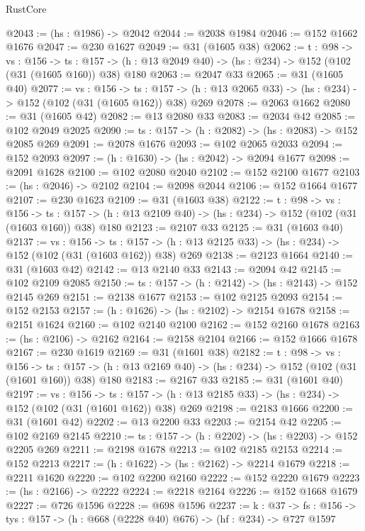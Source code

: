 \begin{lexlean}{RustCore}
\begin{coremodule}
@2043 := (hs : @1986) -> @2042
@2044 := @2038 @1984
@2046 := @152 @1662 @1676
@2047 := @230 @1627
@2049 := @31 (@1605 @38)
@2062 := {t : @98} ->
  {vs : @156} ->
  {ts : @157} -> (h : @13 @2049 @40) -> (hs : @234) -> @152 (@102 (@31 (@1605 @160)) @38) @180
@2063 := @2047 @33
@2065 := @31 (@1605 @40)
@2077 := {vs : @156} ->
  {ts : @157} -> (h : @13 @2065 @33) -> (hs : @234) -> @152 (@102 (@31 (@1605 @162)) @38) @269
@2078 := @2063 @1662
@2080 := @31 (@1605 @42)
@2082 := @13 @2080 @33
@2083 := @2034 @42
@2085 := @102 @2049 @2025
@2090 := {ts : @157} -> (h : @2082) -> (hs : @2083) -> @152 @2085 @269
@2091 := @2078 @1676
@2093 := @102 @2065 @2033
@2094 := @152 @2093
@2097 := (h : @1630) -> (hs : @2042) -> @2094 @1677
@2098 := @2091 @1628
@2100 := @102 @2080 @2040
@2102 := @152 @2100 @1677
@2103 := (hs : @2046) -> @2102
@2104 := @2098 @2044
@2106 := @152 @1664 @1677
@2107 := @230 @1623
@2109 := @31 (@1603 @38)
@2122 := {t : @98} ->
  {vs : @156} ->
  {ts : @157} -> (h : @13 @2109 @40) -> (hs : @234) -> @152 (@102 (@31 (@1603 @160)) @38) @180
@2123 := @2107 @33
@2125 := @31 (@1603 @40)
@2137 := {vs : @156} ->
  {ts : @157} -> (h : @13 @2125 @33) -> (hs : @234) -> @152 (@102 (@31 (@1603 @162)) @38) @269
@2138 := @2123 @1664
@2140 := @31 (@1603 @42)
@2142 := @13 @2140 @33
@2143 := @2094 @42
@2145 := @102 @2109 @2085
@2150 := {ts : @157} -> (h : @2142) -> (hs : @2143) -> @152 @2145 @269
@2151 := @2138 @1677
@2153 := @102 @2125 @2093
@2154 := @152 @2153
@2157 := (h : @1626) -> (hs : @2102) -> @2154 @1678
@2158 := @2151 @1624
@2160 := @102 @2140 @2100
@2162 := @152 @2160 @1678
@2163 := (hs : @2106) -> @2162
@2164 := @2158 @2104
@2166 := @152 @1666 @1678
@2167 := @230 @1619
@2169 := @31 (@1601 @38)
@2182 := {t : @98} ->
  {vs : @156} ->
  {ts : @157} -> (h : @13 @2169 @40) -> (hs : @234) -> @152 (@102 (@31 (@1601 @160)) @38) @180
@2183 := @2167 @33
@2185 := @31 (@1601 @40)
@2197 := {vs : @156} ->
  {ts : @157} -> (h : @13 @2185 @33) -> (hs : @234) -> @152 (@102 (@31 (@1601 @162)) @38) @269
@2198 := @2183 @1666
@2200 := @31 (@1601 @42)
@2202 := @13 @2200 @33
@2203 := @2154 @42
@2205 := @102 @2169 @2145
@2210 := {ts : @157} -> (h : @2202) -> (hs : @2203) -> @152 @2205 @269
@2211 := @2198 @1678
@2213 := @102 @2185 @2153
@2214 := @152 @2213
@2217 := (h : @1622) -> (hs : @2162) -> @2214 @1679
@2218 := @2211 @1620
@2220 := @102 @2200 @2160
@2222 := @152 @2220 @1679
@2223 := (hs : @2166) -> @2222
@2224 := @2218 @2164
@2226 := @152 @1668 @1679
@2227 := @726 @1596
@2228 := @698 @1596
@2237 := {k : @37} ->
  {fs : @156} -> {tys : @157} -> (h : @668 (@2228 @40) @676) -> (hf : @234) -> @727 @1597

\end{coremodule}
\end{lexlean}
